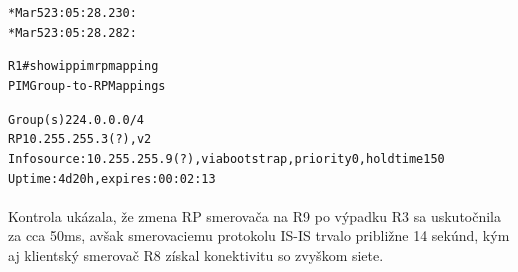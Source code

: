 \documentclass[12pt,twoside,a4paper]{report}
\begin{document}
\noindent
{\selectfont
\begin{small}
\begin{alltt}
*Mar  5 23:05:28.230: %
*Mar  5 23:05:28.282: %
\end{alltt}
\end{small}
}

\noindent
{\selectfont
\begin{small}
\begin{alltt}

R1#show ip pim rp mapping
PIM Group-to-RP Mappings

Group(s) 224.0.0.0/4
  RP 10.255.255.3 (?), v2
    Info source: 10.255.255.9 (?), via bootstrap, priority 0, holdtime 150
         Uptime: 4d20h, expires: 00:02:13

\end{alltt}
\end{small}
}

\paragraph{}
Kontrola ukázala, že zmena RP smerovača na R9 po výpadku R3 sa uskutočnila za cca 50ms, avšak smerovaciemu protokolu IS-IS trvalo približne 14 sekúnd, kým aj klientský smerovač R8 získal konektivitu so zvyškom siete.
\end{document}
